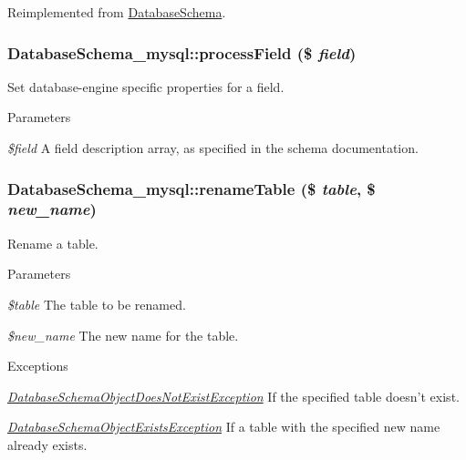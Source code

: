 Reimplemented from \hyperlink{classDatabaseSchema_a45f043158682052792524ab48a188dc5}{DatabaseSchema}.\hypertarget{classDatabaseSchema__mysql_acd9ed95b051e8cce31c5c48e439ed9f3}{
\subsubsection[{processField}]{\setlength{\rightskip}{0pt plus 5cm}DatabaseSchema\_\-mysql::processField (\$ {\em field})}}
\label{classDatabaseSchema__mysql_acd9ed95b051e8cce31c5c48e439ed9f3}
Set database-\/engine specific properties for a field.


\begin{DoxyParams}{Parameters}
\item[{\em \$field}]A field description array, as specified in the schema documentation. \end{DoxyParams}
\hypertarget{classDatabaseSchema__mysql_acd72dda186ab4889a8d5ae2f51b92dba}{
\subsubsection[{renameTable}]{\setlength{\rightskip}{0pt plus 5cm}DatabaseSchema\_\-mysql::renameTable (\$ {\em table}, \/  \$ {\em new\_\-name})}}
\label{classDatabaseSchema__mysql_acd72dda186ab4889a8d5ae2f51b92dba}
Rename a table.


\begin{DoxyParams}{Parameters}
\item[{\em \$table}]The table to be renamed. \item[{\em \$new\_\-name}]The new name for the table.\end{DoxyParams}

\begin{DoxyExceptions}{Exceptions}
\item[{\em \hyperlink{classDatabaseSchemaObjectDoesNotExistException}{DatabaseSchemaObjectDoesNotExistException}}]If the specified table doesn't exist. \item[{\em \hyperlink{classDatabaseSchemaObjectExistsException}{DatabaseSchemaObjectExistsException}}]If a table with the specified new name already exists. \end{DoxyExceptions}


